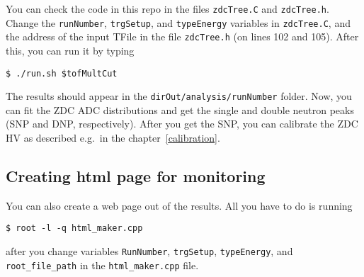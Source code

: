 You can check the code in this repo in the files
\texttt{zdcTree.C} and \texttt{zdcTree.h}. Change the \texttt{runNumber}, \texttt{trgSetup},
and \texttt{typeEnergy} variables in \texttt{zdcTree.C}, and
the address of the input TFile in the file \texttt{zdcTree.h} (on lines 102 and 105). After this, you can run it by
typing
\begin{verbatim}
$ ./run.sh $tofMultCut
\end{verbatim}
The results should appear in the \texttt{dirOut/analysis/runNumber} folder. Now, you can fit the ZDC ADC distributions
and get the single and double neutron peaks (SNP and DNP, respectively). After you get the SNP, you can calibrate
the ZDC HV as described e.g.\ in the chapter~\ref{calibration}.

\subsection{Creating html page for monitoring}\hypertarget{creating-html-page-for-monitoring}{}\label{creating-html-page-for-monitoring}

You can also create a web page out of the results. All you have to do is running
\begin{verbatim}
$ root -l -q html_maker.cpp
\end{verbatim}
after you change variables \texttt{RunNumber}, \texttt{trgSetup}, \texttt{typeEnergy}, 
and \texttt{root\_file\_path} in the \texttt{html\_maker.cpp} file.


